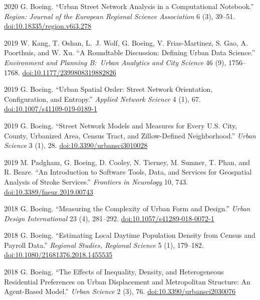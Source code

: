 \documentclass[11pt,letterpaper]{report} %
\begin{document}
\begin{tablist}
        \item[2020] \tab{}G. Boeing. \enquote{Urban Street Network Analysis in a Computational Notebook.} \textit{Region: Journal of the European Regional Science Association} 6 (3), 39--51. \href{https://doi.org/10.18335/region.v6i3.278}{doi:10.18335/region.v6i3.278}

        \item[2019] \tab{}W. Kang, T. Oshan, L.~J. Wolf, G. Boeing, V. Frias-Martinez, S. Gao, A. Poorthuis, and W. Xu. \enquote{A Roundtable Discussion: Defining Urban Data Science.} \textit{Environment and Planning B:\ Urban Analytics and City Science} 46 (9), 1756--1768. \href{https://doi.org/10.1177/2399808319882826}{doi:10.1177/2399808319882826}

        \item[2019] \tab{}G. Boeing. \enquote{Urban Spatial Order: Street Network Orientation, Configuration, and Entropy.} \textit{Applied Network Science} 4 (1), 67. \href{https://doi.org/10.1007/s41109-019-0189-1}{doi:10.1007/s41109-019-0189-1}

        \item[2019] \tab{}G. Boeing. \enquote{Street Network Models and Measures for Every U.S. City, County, Urbanized Area, Census Tract, and Zillow-Defined Neighborhood.} \textit{Urban Science} 3 (1), 28. \href{https://doi.org/10.3390/urbansci3010028}{doi:10.3390/urbansci3010028}

        \item[2019] \tab{}M. Padgham, G. Boeing, D. Cooley, N. Tierney, M. Sumner, T. Phan, and R. Beare. \enquote{An Introduction to Software Tools, Data, and Services for Geospatial Analysis of Stroke Services.} \textit{Frontiers in Neurology} 10, 743. \href{https://doi.org/10.3389/fneur.2019.00743}{doi:10.3389/fneur.2019.00743}

        \item[2018] \tab{}G. Boeing. \enquote{Measuring the Complexity of Urban Form and Design.} \textit{Urban Design International} 23 (4), 281--292. \href{https://doi.org/10.1057/s41289-018-0072-1}{doi:10.1057/s41289-018-0072-1}

        \item[2018] \tab{}G. Boeing. \enquote{Estimating Local Daytime Population Density from Census and Payroll Data.} \textit{Regional Studies, Regional Science} 5 (1), 179--182. \href{https://doi.org/10.1080/21681376.2018.1455535}{doi:10.1080/21681376.2018.1455535}

        \item[2018] \tab{}G. Boeing. \enquote{The Effects of Inequality, Density, and Heterogeneous Residential Preferences on Urban Displacement and Metropolitan Structure: An Agent-Based Model.} \textit{Urban Science} 2 (3), 76. \href{https://doi.org/10.3390/urbansci2030076}{doi:10.3390/urbansci2030076}


\end{tablist}
\end{document}

